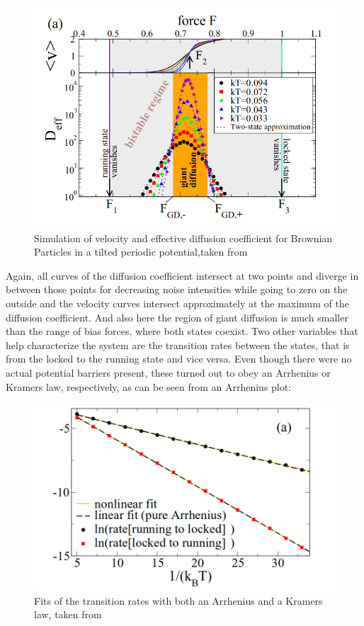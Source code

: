 \documentclass[12pt,a4paper]{article}
\begin{document}
\begin{figure}[H]
	\centering
	\includegraphics[scale=0.5]{nbpsim1.png}\caption{Simulation of velocity and effective diffusion coefficient for Brownian Particles in a tilted periodic potential,taken from \cite{bpp}}
	\label{anbpsim}
\end{figure}
Again, all curves of the diffusion coefficient intersect at two points and diverge in between those points for decreasing noise intensities while going to zero on the outside and the velocity curves intersect approximately at the maximum of the diffusion coefficient. And also here the region of giant diffusion is much smaller than the range of bias forces, where both states coexist. Two other variables that help characterize the system are the transition rates between the states, that is from the locked to the running state and vice versa. Even though there were no actual potential barriers present, these turned out to obey an Arrhenius or Kramers law, respectively, as can be seen from an Arrhenius plot:
\begin{figure}[H]
	\centering
	\includegraphics[scale=0.5]{kramerfit.png}\caption{Fits of the transition rates with both an Arrhenius and a Kramers law, taken from \cite{bpp}}
	\label{bparr}
\end{figure}
\end{document}
